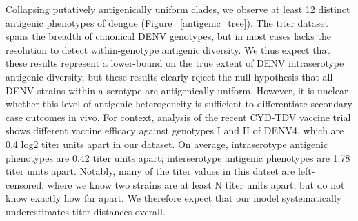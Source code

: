 \documentclass[11pt,oneside,letterpaper]{article}
\begin{document}
Collapsing putatively antigenically uniform clades, we observe at least 12 distinct antigenic phenotypes of dengue (Figure ~\ref{antigenic_tree}).
The titer dataset spans the breadth of canonical DENV genotypes, but in most cases lacks the resolution to detect within-genotype antigenic diversity.
We thus expect that these results represent a lower-bound on the true extent of DENV intraserotype antigenic diversity, but these results clearly reject the null hypothesis that all DENV strains within a serotype are antigenically uniform.
However, it is unclear whether this level of antigenic heterogeneity is sufficient to differentiate secondary case outcomes in vivo.
For context, analysis of the recent CYD-TDV vaccine trial shows different vaccine efficacy against genotypes I and II of DENV4, which are 0.4 log2 titer units apart in our dataset.
On average, intraserotype antigenic phenotypes are 0.42 titer units apart; interserotype antigenic phenotypes are 1.78 titer units apart.
Notably, many of the titer values in this datset are left-censored, where we know two strains are at least N titer units apart, but do not know exactly how far apart.
We therefore expect that our model systematically underestimates titer distances overall.
\end{document}
